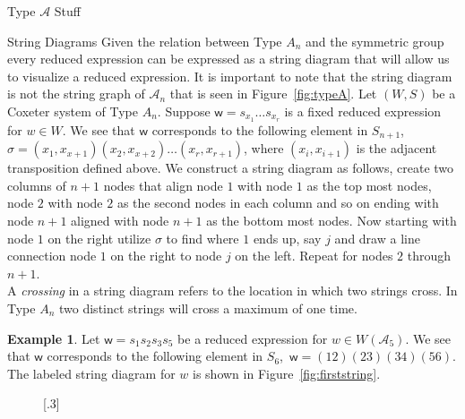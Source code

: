 \documentclass[11pt]{amsart}
\theoremstyle{definition}
\newtheorem{example}[theorem]{Example}
\numberwithin{equation}{section}
\newcommand{\A}{\mathcal{A}}
\renewcommand{\(}{\left(}
\renewcommand{\)}{\right)}
\newcommand{\w}{\mathsf{w}}
\begin{document}
\begin{section}{Type $\A$ Stuff}
\begin{subsection}{String Diagrams}
Given the relation between Type $A_n$ and the symmetric group every reduced expression can be expressed as a string diagram that will allow us to visualize a reduced expression. It is important to note that the string diagram is not the string graph of $\A_n$ that is seen in Figure~\ref{fig:typeA}. Let $(W,S)$ be a Coxeter system of Type $A_n$. Suppose $\w=s_{x_1} \ldots s_{x_r}$ is a fixed reduced expression for $w \in W$. We see that $\w$ corresponds to the following element in $S_{n+1}$, $\sigma=(x_1,x_{x+1})(x_2,x_{x+2}) \ldots (x_r,x_{r+1})$, where $(x_i,x_{i+1})$ is the adjacent transposition defined above. We construct a string diagram as follows, create two columns of $n+1$ nodes that align node $1$ with node $1$ as the top most nodes, node $2$ with node $2$ as the second nodes in each column and so on ending with node $n+1$ aligned with node $n+1$ as the bottom most nodes. Now starting with node $1$ on the right utilize $\sigma$ to find where $1$ ends up, say $j$ and draw a line connection node $1$ on the right to node $j$ on the left. Repeat for nodes $2$ through $n+1$. \\
A \emph{crossing} in a string diagram refers to the location in which two strings cross. In Type $A_n$ two distinct strings will cross a maximum of one time. 
\begin{example}\label{ex:first string}
Let $\w=s_1 s_2 s_3 s_5$ be a reduced expression for $w \in W(\A_5)$. We see that $\w$ corresponds to the following element in $S_6$,~$\w=(12)(23)(34)(56)$. The labeled string diagram for $w$ is shown in Figure~\ref{fig:firststring}.\\	
\begin{figure}[!ht]
\subcaptionbox{\label{fig:firststring}}[.3\textwidth]{
}
\end{figure}
\end{example}
\end{subsection}
\end{section}
\end{document}
